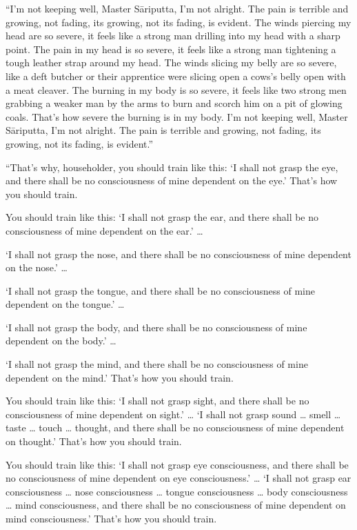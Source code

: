 \documentclass[12pt,openany]{book}%
\begin{document}
“I’m not keeping well, Master \textsanskrit{Sāriputta}, I’m not alright. The pain is terrible and growing, not fading, its growing, not its fading, is evident. The winds piercing my head are so severe, it feels like a strong man drilling into my head with a sharp point. The pain in my head is so severe, it feels like a strong man tightening a tough leather strap around my head. The winds slicing my belly are so severe, like a deft butcher or their apprentice were slicing open a cows’s belly open with a meat cleaver. The burning in my body is so severe, it feels like two strong men grabbing a weaker man by the arms to burn and scorch him on a pit of glowing coals. That’s how severe the burning is in my body. I’m not keeping well, Master \textsanskrit{Sāriputta}, I’m not alright. The pain is terrible and growing, not fading, its growing, not its fading, is evident.” 

“That’s why, householder, you should train like this: ‘I shall not grasp the eye, and there shall be no consciousness of mine dependent on the eye.’ That’s how you should train. 

You should train like this: ‘I shall not grasp the ear, and there shall be no consciousness of mine dependent on the ear.’ … 

‘I shall not grasp the nose, and there shall be no consciousness of mine dependent on the nose.’ … 

‘I shall not grasp the tongue, and there shall be no consciousness of mine dependent on the tongue.’ … 

‘I shall not grasp the body, and there shall be no consciousness of mine dependent on the body.’ … 

‘I shall not grasp the mind, and there shall be no consciousness of mine dependent on the mind.’ That’s how you should train. 

You should train like this: ‘I shall not grasp sight, and there shall be no consciousness of mine dependent on sight.’ … ‘I shall not grasp sound … smell … taste … touch … thought, and there shall be no consciousness of mine dependent on thought.’ That’s how you should train. 

You should train like this: ‘I shall not grasp eye consciousness, and there shall be no consciousness of mine dependent on eye consciousness.’ … ‘I shall not grasp ear consciousness … nose consciousness … tongue consciousness … body consciousness … mind consciousness, and there shall be no consciousness of mine dependent on mind consciousness.’ That’s how you should train. 
\end{document}
